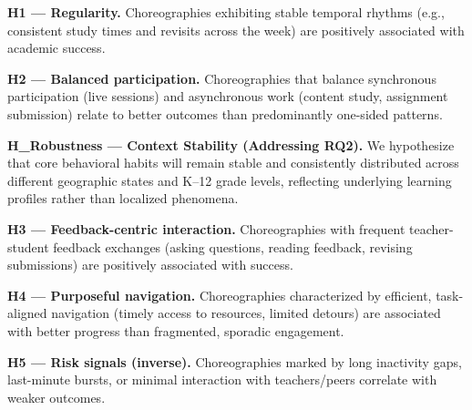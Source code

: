 \medskip
\noindent\textbf{H1 — Regularity.}
Choreographies exhibiting stable temporal rhythms (e.g., consistent study times and revisits across the week) are positively associated with academic success.

\medskip
\noindent\textbf{H2 — Balanced participation.}
Choreographies that balance synchronous participation (live sessions) and asynchronous work (content study, assignment submission) relate to better outcomes than predominantly one-sided patterns.

\medskip
\noindent\textbf{H\_Robustness — Context Stability (Addressing RQ2).}
We hypothesize that core behavioral habits will remain stable and consistently distributed across different geographic states and K--12 grade levels, reflecting underlying learning profiles rather than localized phenomena.

\medskip
\noindent\textbf{H3 — Feedback-centric interaction.}
Choreographies with frequent teacher-student feedback exchanges (asking questions, reading feedback, revising submissions) are positively associated with success.

\medskip
\noindent\textbf{H4 — Purposeful navigation.}
Choreographies characterized by efficient, task-aligned navigation (timely access to resources, limited detours) are associated with better progress than fragmented, sporadic engagement.

\medskip
\noindent\textbf{H5 — Risk signals (inverse).}
Choreographies marked by long inactivity gaps, last-minute bursts, or minimal interaction with teachers/peers correlate with weaker outcomes.